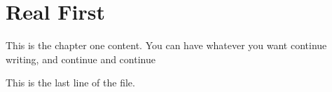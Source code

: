 \chapter{Real First}
\label{chap:ActualFirst}

\noindent This is the chapter one content. You can have whatever you want 
continue writing, and continue and continue	

\noindent This is the last line of the file.